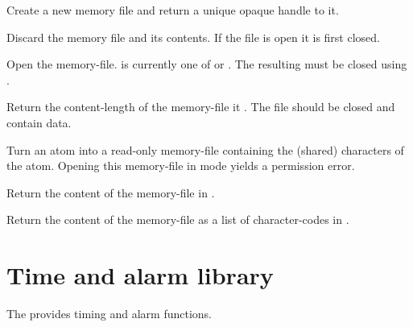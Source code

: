 \documentclass[11pt]{article}
\begin{document}
\begin{description}
Create a new memory file and return a unique opaque handle to it.

Discard the memory file and its contents.  If the file is open it
is first closed.

Open the memory-file.   is currently one of 
or .  The resulting  must be closed
using .

Return the content-length of the memory-file it .  The
file should be closed and contain data.

Turn an atom into a read-only memory-file containing the (shared)
characters of the atom.  Opening this memory-file in mode 
yields a permission error.

Return the content of the memory-file in .

Return the content of the memory-file as a list of character-codes
in .
\end{description}


\section{Time and alarm library}

The  provides timing and alarm functions.  
\end{document}
